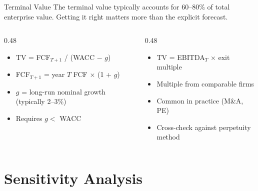 \documentclass[aspectratio=169]{beamer}
\begin{document}
\begin{frame}{Terminal Value}
The terminal value typically accounts for \alert{60--80\%} of total enterprise value.  Getting it right matters more than the explicit forecast.
\vspace{0.3cm}
\begin{columns}[T]
\begin{column}{0.48\textwidth}
\begin{shadedbox}[title=\textbf{Growing Perpetuity}]
\begin{itemize}\small
  \item TV = FCF$_{T+1}$ / (WACC $-$ $g$)
  \item FCF$_{T+1}$ = year $T$ FCF $\times$ (1 + $g$)
  \item $g$ = long-run nominal growth (typically 2--3\%)
  \item Requires $g <$ WACC
\end{itemize}
\end{shadedbox}
\end{column}
\begin{column}{0.48\textwidth}
\begin{shadedbox}[title=\textbf{Exit Multiple}]
\begin{itemize}\small
  \item TV = EBITDA$_T$ $\times$ exit multiple
  \item Multiple from comparable firms
  \item Common in practice (M\&A, PE)
  \item Cross-check against perpetuity method
\end{itemize}
\end{shadedbox}
\end{column}
\end{columns}
\end{frame}

\section{Sensitivity Analysis}
\end{document}
